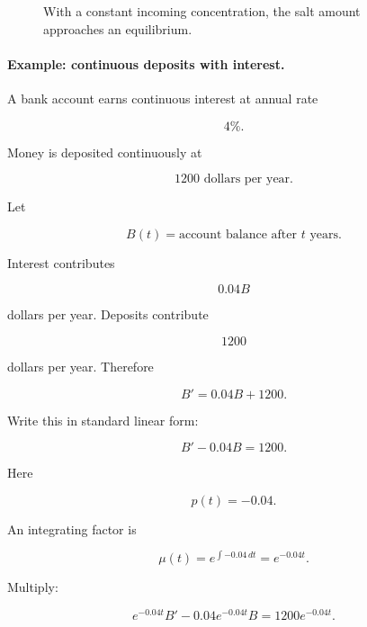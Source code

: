\begin{figure}[h]
\centering
{}
\caption{With a constant incoming concentration, the salt amount approaches an equilibrium.}
\label{fig:linear-mixing-salt}
\end{figure}

\paragraph{Example: continuous deposits with interest.}
A bank account earns continuous interest at annual rate

\[
4\%.
\]

Money is deposited continuously at

\[
1200\text{ dollars per year}.
\]

Let

\[
B(t)=\text{account balance after \(t\) years}.
\]

Interest contributes

\[
0.04B
\]

dollars per year.  Deposits contribute

\[
1200
\]

dollars per year.  Therefore

\[
B'=0.04B+1200.
\]

Write this in standard linear form:

\[
B'-0.04B=1200.
\]

Here

\[
p(t)=-0.04.
\]

An integrating factor is

\[
\mu(t)=e^{\int -0.04\,dt}=e^{-0.04t}.
\]

Multiply:

\[
e^{-0.04t}B'-0.04e^{-0.04t}B=1200e^{-0.04t}.
\]

